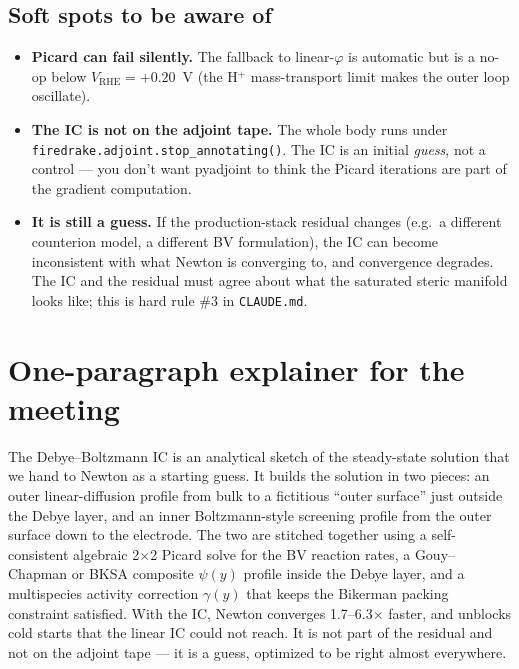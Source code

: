 \documentclass[11pt]{article}
\newcommand{\VRHE}{V_{\mathrm{RHE}}}
\begin{document}
\subsection{Soft spots to be aware of}

\begin{itemize}
\item \textbf{Picard can fail silently.} The fallback to linear-$\varphi$
      is automatic but is a no-op below $\VRHE = +0.20$~V (the
      H$^+$ mass-transport limit makes the outer loop oscillate).
\item \textbf{The IC is not on the adjoint tape.} The whole body
      runs under \texttt{firedrake.adjoint.stop\_annotating()}.
      The IC is an initial \emph{guess}, not a control --- you don't
      want pyadjoint to think the Picard iterations are part of the
      gradient computation.
\item \textbf{It is still a guess.} If the production-stack residual
      changes (e.g.\ a different counterion model, a different BV
      formulation), the IC can become inconsistent with what Newton
      is converging to, and convergence degrades. The IC and the
      residual must agree about what the saturated steric manifold
      looks like; this is hard rule \#3 in
      \texttt{CLAUDE.md}.
\end{itemize}

\section{One-paragraph explainer for the meeting}

\begin{tcolorbox}[notebox, title={The version to say out loud}]
The Debye--Boltzmann IC is an analytical sketch of the steady-state
solution that we hand to Newton as a starting guess. It builds the
solution in two pieces: an outer linear-diffusion profile from bulk
to a fictitious ``outer surface'' just outside the Debye layer, and
an inner Boltzmann-style screening profile from the outer surface
down to the electrode. The two are stitched together using a
self-consistent algebraic 2$\times$2 Picard solve for the BV reaction
rates, a Gouy--Chapman or BKSA composite $\psi(y)$ profile inside the
Debye layer, and a multispecies activity correction $\gamma(y)$ that
keeps the Bikerman packing constraint satisfied. With the IC,
Newton converges 1.7--6.3$\times$ faster, and unblocks cold starts
that the linear IC could not reach. It is not part of the residual
and not on the adjoint tape --- it is a guess, optimized to be
right almost everywhere.
\end{tcolorbox}
\end{document}
